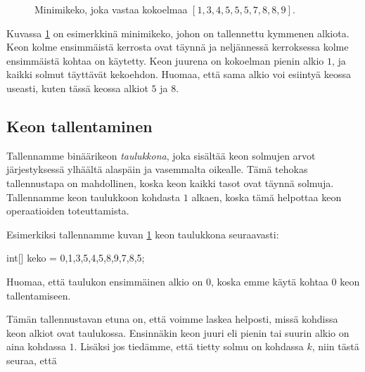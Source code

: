 \begin{figure}
\center
{}
\caption{Minimikeko, joka vastaa kokoelmaa $[1,3,4,5,5,5,7,8,8,9]$.}
\label{fig:minkek}
\end{figure}


Kuvassa \ref{fig:minkek} on esimerkkinä minimikeko,
johon on tallennettu kymmenen alkiota.
Keon kolme ensimmäistä kerrosta ovat täynnä
ja neljännessä kerroksessa kolme ensimmäistä kohtaa on käytetty.
Keon juurena on kokoelman pienin alkio $1$,
ja kaikki solmut täyttävät kekoehdon.
Huomaa, että sama alkio voi esiintyä keossa useasti,
kuten tässä keossa alkiot $5$ ja $8$.

\subsection{Keon tallentaminen}

Tallennamme binäärikeon \emph{taulukkona},
joka sisältää keon solmujen arvot jär\-jestyksessä
ylhäältä alaspäin ja vasemmalta oikealle.
Tämä tehokas tallennustapa on mahdollinen,
koska keon kaikki tasot ovat täynnä solmuja.
Tallennamme keon taulukkoon kohdasta $1$ alkaen,
koska tämä helpottaa keon operaatioiden toteuttamista.

Esimerkiksi tallennamme kuvan \ref{fig:minkek}
keon taulukkona seuraavasti:

\begin{code}
int[] keko = {0,1,3,5,4,5,8,9,7,8,5};
\end{code}

Huomaa, että taulukon ensimmäinen alkio on $0$,
koska emme käytä kohtaa $0$ keon tallentamiseen.

Tämän tallennustavan etuna on, että voimme laskea
helposti, missä kohdissa keon alkiot ovat taulukossa.
Ensinnäkin keon juuri eli pienin tai suurin alkio
on aina kohdassa $1$.
Lisäksi jos tiedämme, että tietty solmu on kohdassa $k$,
niin tästä seuraa, että

